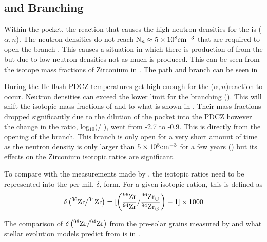 \documentclass[fleqn,usenatbib]{mnras}
\begin{document}
\subsection{\zirconium[95] and \iodine[128] Branching}
\label{sec:branching}

Within the \carbon[13] pocket, the reaction that causes the high neutron densities for the \spr is \carbon[13]($\alpha,n$)\oxygen[16]. The neutron densities do not reach N$_{n} \approx 5\ee{8}\power{\centi\meter}{-3}$ that are required to open the \zirconium[95] branch \citep{zr}. This causes a situation in which there is production of \zirconium[94] from the \spr but due to low neutron densities not as much \zirconium[96] is produced. This can be seen from the isotope mass fractions of Zirconium in . The \spr path and \zirconium[95] branch can be seen in 

During the He-flash PDCZ temperatures get high enough for the \neon[22]($\alpha,n$)\magnesium[25] reaction to occur. Neutron densities can exceed the lower limit for the \zirconium[95] branching (). This will shift the isotopic mass fractions of \zirconium[96] and \zirconium[94] to what is shown in . Their mass fractions dropped significantly due to the dilution of the \carbon[13] pocket into the PDCZ however the change in the ratio, log$_{10}$(\zirconium[96] / \zirconium[94]), went from -2.7 to -0.9. This is directly from the opening of the \zirconium[95] branch. This branch is only open for a very short amount of time as the neutron density is only larger than  $5\ee{8}\power{\centi\meter}{-3}$ for a few years () but its effects on the Zirconium isotopic ratios are significant. 

To compare with the measurements made by \citep{grain}, the isotopic ratios need to be represented into the per mil, $\delta$, form. For a given isotopic ration, this is defined as
\begin{equation}
\delta\left(\zirconium[96] / \zirconium[94]\right) = [\left(\frac{\zirconium[96]}{\zirconium[94]} / \frac{\zirconium[96]_{\odot}}{\zirconium[94]_{\odot}}\right) - 1]\times 1000
\label{eq:mil}
\end{equation}

\noindent The comparison of $\delta\left(\zirconium[96] / \zirconium[94]\right)$ from the pre-solar grains measured by \citep{grain} and what stellar evolution models predict from \citep{zr} is in .
\end{document}
